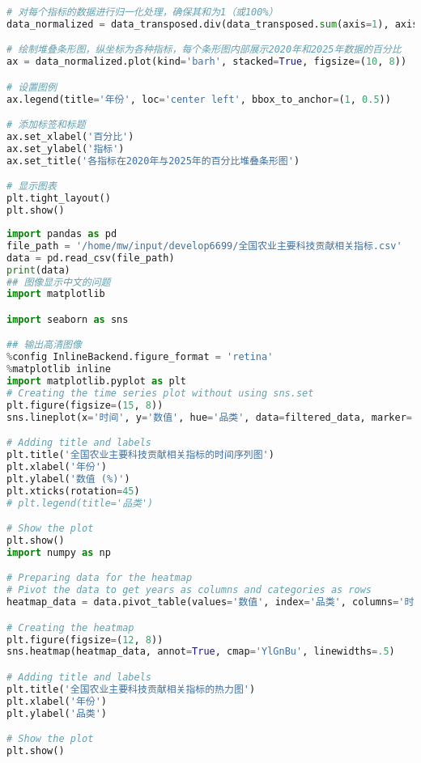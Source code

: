 \begin{lstlisting}[language=python,caption={十四五规划可视化}]
# 对每个指标的数据进行归一化处理，确保其和为1（或100%）
data_normalized = data_transposed.div(data_transposed.sum(axis=1), axis=0)

# 绘制堆叠条形图，纵坐标为各种指标，每个条形图内部展示2020年和2025年数据的百分比
ax = data_normalized.plot(kind='barh', stacked=True, figsize=(10, 8))

# 设置图例
ax.legend(title='年份', loc='center left', bbox_to_anchor=(1, 0.5))

# 添加标签和标题
ax.set_xlabel('百分比')
ax.set_ylabel('指标')
ax.set_title('各指标在2020年与2025年的百分比堆叠条形图')

# 显示图表
plt.tight_layout()
plt.show()
\end{lstlisting}
\begin{lstlisting}[language=python,caption={主要贡献}]
import pandas as pd
file_path = '/home/mw/input/develop6699/全国农业主要科技贡献相关指标.csv'
data = pd.read_csv(file_path)
print(data)
## 图像显示中文的问题
import matplotlib

import seaborn as sns

## 输出高清图像
%config InlineBackend.figure_format = 'retina'
%matplotlib inline
import matplotlib.pyplot as plt
# Creating the time series plot without using sns.set
plt.figure(figsize=(15, 8))
sns.lineplot(x='时间', y='数值', hue='品类', data=filtered_data, marker='o')

# Adding title and labels
plt.title('全国农业主要科技贡献相关指标的时间序列图')
plt.xlabel('年份')
plt.ylabel('数值 (%)')
plt.xticks(rotation=45)
# plt.legend(title='品类')

# Show the plot
plt.show()
import numpy as np

# Preparing data for the heatmap
# Pivot the data to get years as columns and categories as rows
heatmap_data = data.pivot_table(values='数值', index='品类', columns='时间', aggfunc=np.mean)

# Creating the heatmap
plt.figure(figsize=(12, 8))
sns.heatmap(heatmap_data, annot=True, cmap='YlGnBu', linewidths=.5)

# Adding title and labels
plt.title('全国农业主要科技贡献相关指标的热力图')
plt.xlabel('年份')
plt.ylabel('品类')

# Show the plot
plt.show()
\end{lstlisting}
